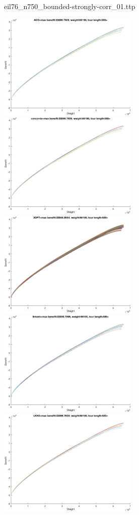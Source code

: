 \documentclass{article}
\begin{document}
\newpage
eil76\_n750\_bounded-strongly-corr\_01.ttp

\noindent
\includegraphics[width=0.5\textwidth]{eil76figs/eil76_n750_bounded-strongly-corr_01.ttp.aco.txt.eps}
\includegraphics[width=0.5\textwidth]{eil76figs/eil76_n750_bounded-strongly-corr_01.ttp.con.txt.eps}
\includegraphics[width=0.5\textwidth]{eil76figs/eil76_n750_bounded-strongly-corr_01.ttp.inv.txt.eps}
\includegraphics[width=0.5\textwidth]{eil76figs/eil76_n750_bounded-strongly-corr_01.ttp.lkh.txt.eps}
\includegraphics[width=0.5\textwidth]{eil76figs/eil76_n750_bounded-strongly-corr_01.ttp.lkh2.txt.eps}
\end{document}
